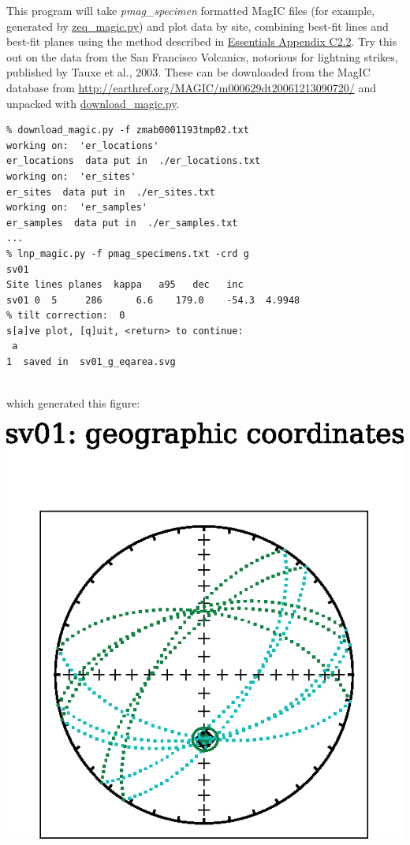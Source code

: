 \documentclass[11pt]{book}
\begin{document}
{{{This program will take {\it pmag\_specimen} formatted MagIC files (for example, generated by \href{#zeq_magic.py}{zeq\_magic.py}) and plot data by site, combining best-fit lines and best-fit planes using the method described in  \href{http://magician.ucsd.edu/Essentials_2/WebBook2ap3.html#linesNplanes}{Essentials Appendix C2.2}.  Try this out on the data from the San Francisco Volcanics, notorious for lightning strikes, published by Tauxe et al., 2003. \nocite{tauxe03b}  These can be downloaded from the MagIC database from \url{http://earthref.org/MAGIC/m000629dt20061213090720/} and unpacked with 
\href{#download_magic.py}{download\_magic.py}.   


\begin{verbatim}
% download_magic.py -f zmab0001193tmp02.txt
working on:  'er_locations'
er_locations  data put in  ./er_locations.txt
working on:  'er_sites'
er_sites  data put in  ./er_sites.txt
working on:  'er_samples'
er_samples  data put in  ./er_samples.txt
...
% lnp_magic.py -f pmag_specimens.txt -crd g
sv01
Site lines planes  kappa   a95   dec   inc
sv01 0  5     286      6.6    179.0    -54.3  4.9948 
% tilt correction:  0
s[a]ve plot, [q]uit, <return> to continue:
 a
1  saved in  sv01_g_eqarea.svg
 
\end{verbatim}

\noindent which generated this figure:

\includegraphics[width=12 cm]{EPSfiles/lnp-ex.eps}

}}}
\end{document}
